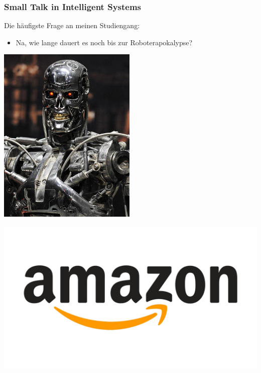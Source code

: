 \documentclass[aspectratio=43]{beamer}
\begin{document}
\begin{frame}
\frametitle{Small Talk in Intelligent Systems}

\begin{multicols}{2}

Die häufigste Frage an meinen Studiengang:

\pause

\begin{itemize}
\item \glqq Na, wie lange dauert es noch bis zur Roboterapokalypse?\grqq
\end{itemize}

\columnbreak

\includegraphics[height=0.7\textheight,keepaspectratio]{images/Robot-Apocalypse.jpg} 

\end{multicols}

\end{frame}

\begin{frame}
\begin{center}
\includegraphics[width=\textwidth]{images/amazon-logo.jpg} 
\end{center}
\end{frame}
\end{document}
